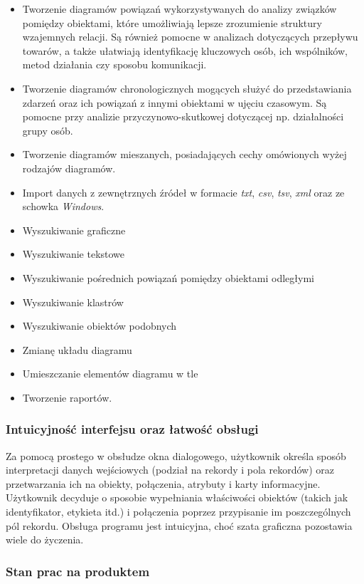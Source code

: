 \documentclass[11pt,a4paper]{article}
\begin{document}
\begin{itemize}
	\item Tworzenie diagramów powiązań wykorzystywanych do analizy związków pomiędzy obiektami, które umożliwiają lepsze zrozumienie struktury wzajemnych relacji. Są również pomocne w analizach dotyczących przepływu towarów, a także ułatwiają identyfikację kluczowych osób, ich wspólników, metod działania czy sposobu komunikacji.
	\item Tworzenie diagramów chronologicznych mogących służyć do przedstawiania zdarzeń oraz ich powiązań z innymi obiektami w ujęciu czasowym. Są pomocne przy analizie przyczynowo-skutkowej dotyczącej np. działalności grupy osób.
	\item Tworzenie diagramów mieszanych, posiadających cechy omówionych wyżej rodzajów diagramów.
	\item Import danych z zewnętrznych źródeł w formacie \emph{txt}, \emph{csv}, \emph{tsv}, \emph{xml} oraz ze schowka \emph{Windows}.
	\item Wyszukiwanie graficzne
	\item Wyszukiwanie tekstowe
	\item Wyszukiwanie pośrednich powiązań pomiędzy obiektami odległymi
	\item Wyszukiwanie klastrów
	\item Wyszukiwanie obiektów podobnych
	\item Zmianę układu diagramu
	\item Umieszczanie elementów diagramu w tle
	\item Tworzenie raportów.
\end{itemize}

\subsubsection*{Intuicyjność interfejsu oraz łatwość obsługi}

Za pomocą prostego w obsłudze okna dialogowego, użytkownik określa sposób interpretacji danych wejściowych (podział na rekordy i pola rekordów) oraz przetwarzania ich na obiekty, połączenia, atrybuty i karty informacyjne. Użytkownik decyduje o sposobie wypełniania właściwości obiektów (takich jak identyfikator, etykieta itd.) i połączenia poprzez przypisanie im poszczególnych pól rekordu. Obsługa programu jest intuicyjna, choć szata graficzna pozostawia wiele do życzenia.

\subsubsection*{Stan prac na produktem}
\end{document}
